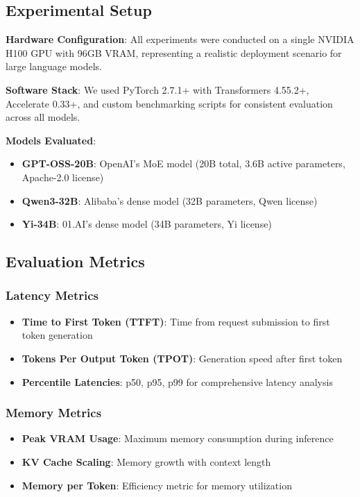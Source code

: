 \documentclass[11pt]{article}
\begin{document}
\subsection{Experimental Setup}

\textbf{Hardware Configuration}: All experiments were conducted on a single NVIDIA H100 GPU with 96GB VRAM, representing a realistic deployment scenario for large language models.

\textbf{Software Stack}: We used PyTorch 2.7.1+ with Transformers 4.55.2+, Accelerate 0.33+, and custom benchmarking scripts for consistent evaluation across all models.

\textbf{Models Evaluated}:
\begin{itemize}
    \item \textbf{GPT-OSS-20B}: OpenAI's MoE model (20B total, 3.6B active parameters, Apache-2.0 license)
    \item \textbf{Qwen3-32B}: Alibaba's dense model (32B parameters, Qwen license)
    \item \textbf{Yi-34B}: 01.AI's dense model (34B parameters, Yi license)
\end{itemize}

\subsection{Evaluation Metrics}

\subsubsection{Latency Metrics}
\begin{itemize}
    \item \textbf{Time to First Token (TTFT)}: Time from request submission to first token generation
    \item \textbf{Tokens Per Output Token (TPOT)}: Generation speed after first token
    \item \textbf{Percentile Latencies}: p50, p95, p99 for comprehensive latency analysis
\end{itemize}

\subsubsection{Memory Metrics}
\begin{itemize}
    \item \textbf{Peak VRAM Usage}: Maximum memory consumption during inference
    \item \textbf{KV Cache Scaling}: Memory growth with context length
    \item \textbf{Memory per Token}: Efficiency metric for memory utilization
\end{itemize}
\end{document}
